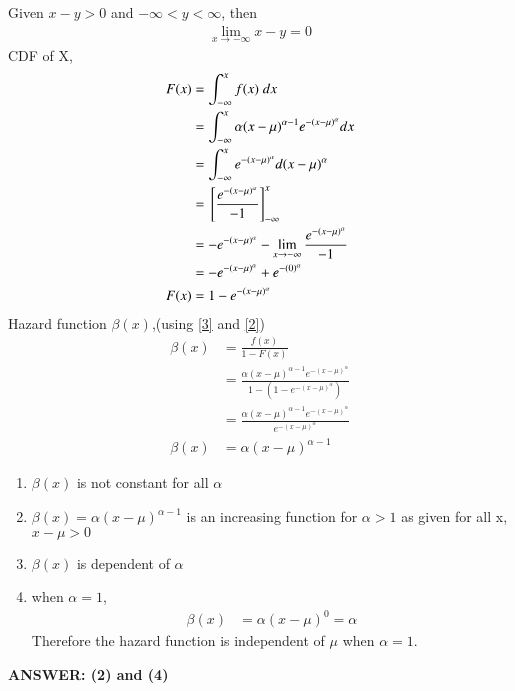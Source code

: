 \documentclass[journal,12pt,twocolumn]{IEEEtran}
\begin{document}
Given $x-y>0$ and $-\infty<y<\infty$, then
\begin{align}
    \lim_{x \to -\infty} x-y=0
\end{align}
CDF of X,
\begin{align}
    F(x)&=\int_{-\infty}^x{f(x)\;dx}\\
    &=\int_{-\infty}^x{\alpha(x-\mu)^{\alpha-1}e^{-(x-\mu)^{\alpha}}dx}\\
    &=\int_{-\infty}^x{e^{-(x-\mu)^{\alpha}}d(x-\mu)^{\alpha}}\\
    &={}\left[\frac{e^{-(x-\mu)^{\alpha}}}{-1}\right]_{-\infty}^x\\
    &=-e^{-(x-\mu)^{\alpha}}-\lim_{x \to -\infty} \frac{e^{-(x-\mu)^{\alpha}}}{-1}\label{1}\\
    &=-e^{-(x-\mu)^{\alpha}}+ {e^{-(0)^{\alpha}}}\\
   F(x) &=1-e^{-(x-\mu)^{\alpha}}\label{2}
\end{align}
Hazard function $\beta(x)$,(using \eqref{3} and \eqref{2})
\begin{align}
    \beta(x)&=\frac{f(x)}{1-F(x)}\\
    &=\frac{\alpha(x-\mu)^{\alpha-1}e^{-(x-\mu)^{\alpha}}}{1-(1-e^{-(x-\mu)^{\alpha}})}\\
    &=\frac{\alpha(x-\mu)^{\alpha-1}e^{-(x-\mu)^{\alpha}}}{e^{-(x-\mu)^{\alpha}}}\\
    \beta(x)&=\alpha(x-\mu)^{\alpha-1}
\end{align}
\begin{enumerate}
    \item $\beta(x)$ is not constant for all $\alpha$
    \item $\beta(x)=\alpha(x-\mu)^{\alpha-1}$ is an increasing function for $\alpha>1$ as given for all x, $x-\mu>0$
    \item $\beta(x)$ is dependent of $\alpha$
    \item when $\alpha=1$,
\begin{align}
    \beta(x)&=\alpha(x-\mu)^{0}=\alpha
\end{align}
Therefore the hazard function is independent of $\mu$ when $\alpha=1$.
\end{enumerate}
\textbf{ANSWER: (2) and (4)}
\end{document}
